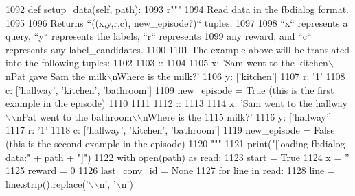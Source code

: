 \begin{DoxyCode}
1092     \textcolor{keyword}{def }\hyperlink{namespaceparlai_1_1tasks_1_1aqua_1_1agents_a2d4e9f4e80d4edc0646c7e3d52be9f25}{setup\_data}(self, path):
1093         \textcolor{stringliteral}{r"""}
1094 \textcolor{stringliteral}{        Read data in the fbdialog format.}
1095 \textcolor{stringliteral}{}
1096 \textcolor{stringliteral}{        Returns ``((x,y,r,c), new\_episode?)`` tuples.}
1097 \textcolor{stringliteral}{}
1098 \textcolor{stringliteral}{        ``x`` represents a query, ``y`` represents the labels, ``r`` represents}
1099 \textcolor{stringliteral}{        any reward, and ``c`` represents any label\_candidates.}
1100 \textcolor{stringliteral}{}
1101 \textcolor{stringliteral}{        The example above will be translated into the following tuples:}
1102 \textcolor{stringliteral}{}
1103 \textcolor{stringliteral}{        ::}
1104 \textcolor{stringliteral}{}
1105 \textcolor{stringliteral}{            x: 'Sam went to the kitchen\(\backslash\)nPat gave Sam the milk\(\backslash\)nWhere is the milk?'}
1106 \textcolor{stringliteral}{            y: ['kitchen']}
1107 \textcolor{stringliteral}{            r: '1'}
1108 \textcolor{stringliteral}{            c: ['hallway', 'kitchen', 'bathroom']}
1109 \textcolor{stringliteral}{            new\_episode = True (this is the first example in the episode)}
1110 \textcolor{stringliteral}{}
1111 \textcolor{stringliteral}{}
1112 \textcolor{stringliteral}{        ::}
1113 \textcolor{stringliteral}{}
1114 \textcolor{stringliteral}{            x: 'Sam went to the hallway\(\backslash\)\(\backslash\)nPat went to the bathroom\(\backslash\)\(\backslash\)nWhere is the}
1115 \textcolor{stringliteral}{                milk?'}
1116 \textcolor{stringliteral}{            y: ['hallway']}
1117 \textcolor{stringliteral}{            r: '1'}
1118 \textcolor{stringliteral}{            c: ['hallway', 'kitchen', 'bathroom']}
1119 \textcolor{stringliteral}{            new\_episode = False (this is the second example in the episode)}
1120 \textcolor{stringliteral}{        """}
1121         print(\textcolor{stringliteral}{"[loading fbdialog data:"} + path + \textcolor{stringliteral}{"]"})
1122         with open(path) \textcolor{keyword}{as} read:
1123             start = \textcolor{keyword}{True}
1124             x = \textcolor{stringliteral}{''}
1125             reward = 0
1126             last\_conv\_id = \textcolor{keywordtype}{None}
1127             \textcolor{keywordflow}{for} line \textcolor{keywordflow}{in} read:
1128                 line = line.strip().replace(\textcolor{stringliteral}{'\(\backslash\)\(\backslash\)n'}, \textcolor{stringliteral}{'\(\backslash\)n'})

\end{DoxyCode}

